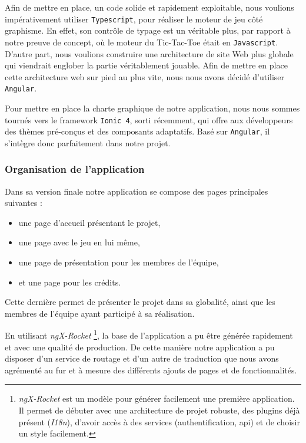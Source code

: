 \documentclass[a4paper,11pt]{article}
\providecommand{\tightlist}{%
  \setlength{\itemsep}{0pt}\setlength{\parskip}{0pt}}
\begin{document}
Afin de mettre en place, un code solide et rapidement exploitable, nous
voulions impérativement utiliser \texttt{Typescript}, pour réaliser le
moteur de jeu côté graphisme. En effet, son contrôle de typage est un
véritable plus, par rapport à notre preuve de concept, où le moteur du
Tic-Tac-Toe était en \texttt{Javascript}. D'autre part, nous voulions
construire une architecture de site Web plus globale qui viendrait
englober la partie véritablement jouable. Afin de mettre en place cette
architecture web sur pied au plus vite, nous nous avons décidé
d'utiliser \texttt{Angular}.

Pour mettre en place la charte graphique de notre application, nous nous
sommes tournés vers le framework \texttt{Ionic\ 4}, sorti récemment, qui
offre aux développeurs des thèmes pré-conçus et des composants
adaptatifs. Basé sur \texttt{Angular}, il s'intègre donc parfaitement
dans notre projet.

\hypertarget{organisation-de-lapplication}{%
\subsubsection{Organisation de
l'application}\label{organisation-de-lapplication}}

Dans sa version finale notre application se compose des pages
principales suivantes :

\begin{itemize}
\tightlist
\item
  une page d'accueil présentant le projet,
\item
  une page avec le jeu en lui même,
\item
  une page de présentation pour les membres de l'équipe,
\item
  et une page pour les crédits.
\end{itemize}

Cette dernière permet de présenter le projet dans sa globalité, ainsi
que les membres de l'équipe ayant participé à sa réalisation.

En utilisant \emph{ngX-Rocket} \citep{ngxrocket}\footnote{\emph{ngX-Rocket}
  est un modèle pour générer facilement une première application. Il
  permet de débuter avec une architecture de projet robuste, des plugins
  déjà présent (\emph{I18n}), d'avoir accès à des services
  (authentification, api) et de choisir un style facilement.}, la base
de l'application a pu être générée rapidement et avec une qualité de
production. De cette manière notre application a pu disposer d'un
service de routage et d'un autre de traduction que nous avons agrémenté
au fur et à mesure des différents ajouts de pages et de fonctionnalités.
\end{document}
